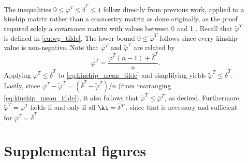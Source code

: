 \documentclass[11pt]{article}
\newcommand{\beginsupplement}{%
  \setcounter{table}{0}
  \renewcommand{\thetable}{S\arabic{table}}%
  \setcounter{figure}{0}
  \renewcommand{\thefigure}{S\arabic{figure}}%
  \setcounter{section}{0}
  \renewcommand{\thesection}{S\arabic{section}}%
  \setcounter{equation}{0}
  \renewcommand{\theequation}{S\arabic{equation}}%
  \setcounter{page}{1}
  \renewcommand{\thepage}{S\arabic{page}}%
}
\begin{document}
\begin{appendices}
  The inequalities $0 \le \bar{\varphi}^T \le \bar{\delta}^T \le 1$ follow directly from previous work, applied to a kinship matrix rather than a coancestry matrix as done originally, as the proof required solely a covariance matrix with values between 0 and 1 \citep{ochoa_estimating_2021}.
  Recall that $\tilde{\varphi}^T$ is defined in \cref{eq:wg_tilde}.
  The lower bound $0 \le \tilde{\varphi}^T$ follows since every kinship value is non-negative.
  Note that $\bar{\varphi}^T$ and $\tilde{\varphi}^T$ are related by
  \begin{equation}
    \label{eq:kinship_mean_tilde}
    \bar{\varphi}^T
    =
    \frac{ \tilde{\varphi}^T (n-1) + \bar{\delta}^T }{n}.
  \end{equation}
  Applying $\bar{\varphi}^T \le \bar{\delta}^T$ to \cref{eq:kinship_mean_tilde} and simplifying yields $\tilde{\varphi}^T \le \bar{\delta}^T$.
  Lastly, since $\bar{\varphi}^T - \tilde{\varphi}^T = \left( \bar{\delta}^T - \tilde{\varphi}^T \right) / n$ (from rearranging \cref{eq:kinship_mean_tilde}), it also follows that $\tilde{\varphi}^T \le \bar{\varphi}^T$, as desired.
  Furthermore, $\tilde{\varphi}^T = \bar{\varphi}^T$ holds if and only if all $\kt = \bar{\delta}^T$, since that is necessary and sufficient for $\bar{\varphi}^T = \bar{\delta}^T$.

\end{appendices}




\clearpage

\beginsupplement

\section*{Supplemental figures}
\end{document}
